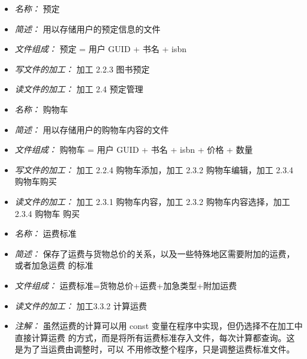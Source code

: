 \vspace{-1mm}


\begin{itemize}
\item \textit{名称： }预定 
\item \textit{简述： }用以存储用户的预定信息的文件 
\item \textit{文件组成： }预定 = 用户 GUID + 书名 + isbn
\item \textit{写文件的加工： }加工 2.2.3 图书预定 
\item \textit{读文件的加工： }加工 2.4 预定管理

\end{itemize}


\vspace{-1mm}


\begin{itemize}
\item \textit{名称： }购物车
\item \textit{简述： }用以存储用户的购物车内容的文件
\item \textit{文件组成： }购物车 = 用户 GUID + 书名 + isbn + 价格 + 数量
\item \textit{写文件的加工： }加工 2.2.4 购物车添加，加工 2.3.2 购物车编辑，加工 2.3.4 购物车购买 
\item \textit{读文件的加工： }加工 2.3.1 购物车内容，加工 2.3.2 购物车内容选择，加工 2.3.4 购物车 购买

\end{itemize}


\vspace{-1mm}


\begin{itemize}
\item \textit{名称： }运费标准 
\item \textit{简述： }保存了运费与货物总价的关系，以及一些特殊地区需要附加的运费，或者加急运费 的标准
\item \textit{文件组成： }运费标准={货物总价+运费}+{加急类型+附加运费}
\item \textit{读文件的加工： }加工3.3.2 计算运费
\item \textit{注解： }虽然运费的计算可以用 const 变量在程序中实现，但仍选择不在加工中直接计算运费 的方式，而是将所有运费标准存入文件，每次计算都查询。这是为了当运费由调整时，可以 不用修改整个程序，只是调整运费标准文件。

\end{itemize}


\vspace{-1mm}

